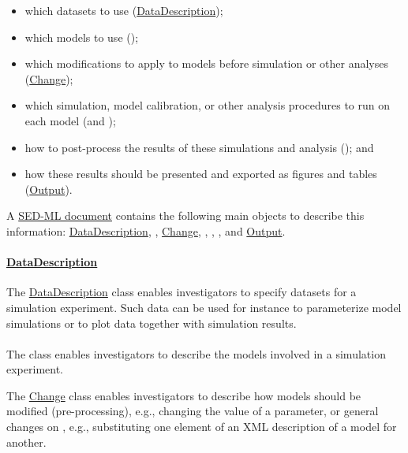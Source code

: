 \begin{itemize}
\item which datasets to use (\hyperref[class:dataDescription]{DataDescription});
\item which models to use (\Model);
\item which modifications to apply to models before simulation or other analyses (\hyperref[class:change]{Change});
\item which simulation, model calibration, or other analysis procedures to run on each model (\Simulation and \AbstractTask);
\item how to post-process the results of these simulations and analysis (\DataGenerator); and
\item how these results should be presented and exported as figures and tables (\hyperref[class:output]{Output}).
\end{itemize}

A \hyperref[class:sed-ml]{SED-ML document} contains the following main objects to describe this information: \hyperref[class:dataDescription]{DataDescription}, \Model, \hyperref[class:change]{Change}, \Simulation, \AbstractTask, \DataGenerator, and \hyperref[class:output]{Output}.

\paragraph*{\hyperref[class:dataDescription]{DataDescription}}
The \hyperref[class:dataDescription]{DataDescription} class enables investigators to specify datasets for a simulation experiment. Such data can be used for instance to parameterize model simulations or to plot data together with simulation results.

\paragraph*{\Model}
The \Model class enables investigators to describe the models involved in a simulation experiment.

The \hyperref[class:change]{Change} class enables investigators to describe how models should be modified (pre-processing), e.g., changing the value of a parameter, or general changes on , e.g., substituting one element of an XML description of a model for another.

